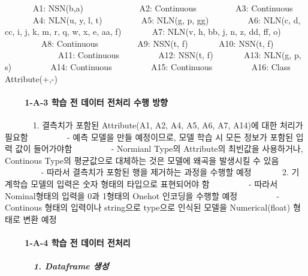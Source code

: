 \documentclass[11pt]{article}
\begin{document}
        A1: NSN(b,a)        A2: Continuous      A3: Continuous     A4:
NLN(u, y, l, t)      A5: NLN(g, p, gg)      A6: NLN(c, d, cc, i, j, k,
m, r, q, w, x, e, aa, f)     A7: NLN(v, h, bb, j, n, z, dd, ff, o)     
A8: Continuous      A9: NSN(t, f)     A10: NSN(t, f)        A11:
Continuous      A12: NSN(t, f)     A13: NLN(g, p, s)      A14:
Continuous      A15: Continuous      A16: Class Attribute(+,-)

    \hypertarget{a-3-uxd559uxc2b5-uxc804-uxb370uxc774uxd130-uxc804uxcc98uxb9ac-uxc218uxd589-uxbc29uxd5a5}{%
\paragraph{   1-A-3 학습 전 데이터 전처리 수행
방향}\label{a-3-uxd559uxc2b5-uxc804-uxb370uxc774uxd130-uxc804uxcc98uxb9ac-uxc218uxd589-uxbc29uxd5a5}}

        1. 결측치가 포함된 Attribute(A1, A2, A4, A5, A6, A7, A14)에 대한
처리가 필요함      - 예측 모델을 만들 예정이므로, 모델 학습 시 모든
정보가 포함된 입력 값이 들어가야함      - Normianl Type의 Attribute의
최빈값을 사용하거나, Continous Type의 평균값으로 대체하는 것은 모델에
왜곡을 발생시킬 수 있음      - 따라서 결측치가 포함된 행을 제거하는
과정을 수행할 예정     2. 기계학습 모델의 입력은 숫자 형태의 타입으로
표현되어야 함      - 따라서 Nominal형태의 입력을 0과 1형태의 Onehot
인코딩을 수행할 예정      - Continous 형태의 입력이나 string으로
type으로 인식된 모델을 Numerical(float) 형태로 변환 예정

    \hypertarget{a-4-uxd559uxc2b5-uxc804-uxb370uxc774uxd130-uxc804uxcc98uxb9ac}{%
\paragraph{   1-A-4 학습 전 데이터
전처리}\label{a-4-uxd559uxc2b5-uxc804-uxb370uxc774uxd130-uxc804uxcc98uxb9ac}}

    \hypertarget{dataframe-uxc0dduxc131}{%
\subparagraph{    1. Dataframe 생성}\label{dataframe-uxc0dduxc131}}
\end{document}

